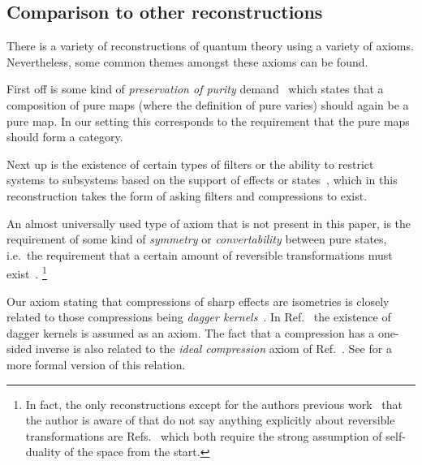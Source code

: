 \documentclass[b5paper,onecolumn,12pt,accepted=2019-05-03, issue=1, volume=1, shorttitle=papers/compositionality-1-1]{compositionalityarticle}
\numberwithin{counter}{section}
\begin{document}
\subsection{Comparison to other reconstructions}
There is a variety of reconstructions of quantum theory using a variety of axioms. Nevertheless, some common themes amongst these axioms can be found. 

First off is some kind of \emph{preservation of purity} demand~\cite{chiribella2015operational,barnum2014higher,hardy2011reformulating,gunson1967algebraic,tull2016reconstruction,selby2018reconstructing} which states that a composition of pure maps (where the definition of pure varies) should again be a pure map. In our setting this corresponds to the requirement that the pure maps should form a category.

Next up is the existence of certain types of filters or the ability to restrict systems to subsystems based on the support of effects or states~\cite{chiribella2011informational,hardy2011reformulating,wilce2018royal,tull2016reconstruction,barnum2014higher,gunson1967algebraic}, which in this reconstruction takes the form of asking filters and compressions to exist.

An almost universally used type of axiom that is not present in this paper, is the requirement of some kind of \emph{symmetry} or \emph{convertability} between pure states, i.e.\ the requirement that a certain amount of reversible transformations must exist~\cite{barnum2014higher,hardy2001quantum,hardy2011reformulating,dakic2009quantum,masanes2014entanglement,krumm2017thermodynamics,chiribella2011informational,tull2016reconstruction,selby2018reconstructing,hohn2017toolbox}. \footnote{In fact, the only reconstructions except for the authors previous work~\cite{wetering2018sequential} that the author is aware of that do not say anything explicitly about reversible transformations are Refs.~\cite{gunson1967algebraic,wilce2018royal} which both require the strong assumption of self-duality of the space from the start.}

Our axiom stating that compressions of sharp effects are isometries is closely related to those compressions being \emph{dagger kernels}~\cite{heunen2010quantum}. In Ref.~\cite{tull2016reconstruction} the existence of dagger kernels is assumed as an axiom. The fact that a compression has a one-sided inverse is also related to the \emph{ideal compression} axiom of Ref.~\cite{chiribella2011informational}. See \cite[Theorem 4.21]{tull2019phdthesis} for a more formal version of this relation.
\end{document}
